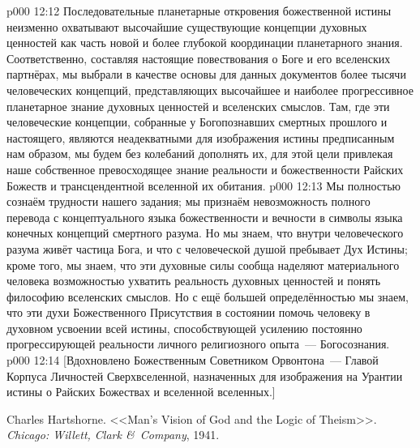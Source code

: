 \vs p000 12:12 Последовательные планетарные откровения божественной истины неизменно охватывают высочайшие существующие концепции духовных ценностей как часть новой и более глубокой координации планетарного знания. Соответственно, составляя настоящие повествования о Боге и его вселенских партнёрах, мы выбрали в качестве основы для данных документов более тысячи человеческих концепций, представляющих высочайшее и наиболее прогрессивное планетарное знание духовных ценностей и вселенских смыслов. Там, где эти человеческие концепции, собранные у Богопознавших смертных прошлого и настоящего, являются неадекватными для изображения истины предписанным нам образом, мы будем без колебаний дополнять их, для этой цели привлекая наше собственное превосходящее знание реальности и божественности Райских Божеств и трансцендентной вселенной их обитания.
\vs p000 12:13 Мы полностью сознаём трудности нашего задания; мы признаём невозможность полного перевода с концептуального языка божественности и вечности в символы языка конечных концепций смертного разума. Но мы знаем, что внутри человеческого разума живёт частица Бога, и что с человеческой душой пребывает Дух Истины; кроме того, мы знаем, что эти духовные силы сообща наделяют материального человека возможностью ухватить реальность духовных ценностей и понять философию вселенских смыслов. Но с ещё большей определённостью мы знаем, что эти духи Божественного Присутствия в состоянии помочь человеку в духовном усвоении всей истины, способствующей усилению постоянно прогрессирующей реальности личного религиозного опыта~--- Богосознания.
\vsetoff
\vs p000 12:14 [Вдохновлено Божественным Советником Орвонтона~--- Главой Корпуса Личностей Сверхвселенной, назначенных для изображения на Урантии истины о Райских Божествах и вселенной вселенных.]
\quizlink
\begin{thebibliography}{100}
Charles Hartshorne.
{<<Man's Vision of God and the Logic of Theism>>.}
{\em Chicago: Willett, Clark \&\ Company}, 1941.
\end{thebibliography}
